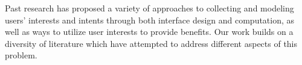 \documentclass{sigchi}
\begin{document}
Past research has proposed a variety of approaches to collecting and modeling users' interests and intents through both interface design and computation, as well as ways to utilize user interests to provide benefits. Our work builds on a diversity of literature which have attempted to address different aspects of this problem.



\end{document}
